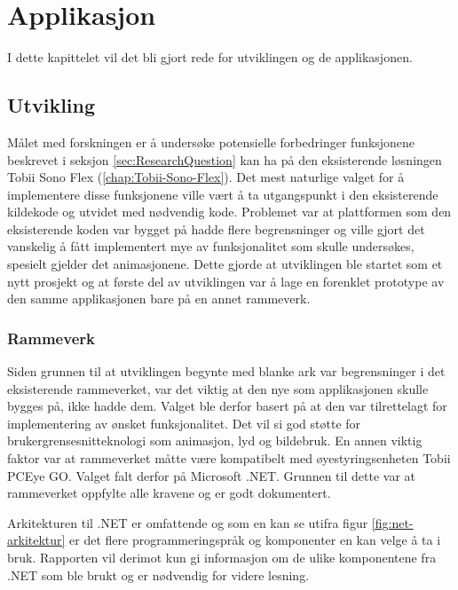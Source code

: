 \documentclass[phd,tocprelim]{cornell}
\begin{document}
\chapter{Applikasjon}

I dette kapittelet vil det bli gjort rede for utviklingen og de applikasjonen.


\section{Utvikling}


Målet med forskningen er å undersøke potensielle forbedringer funksjonene beskrevet i seksjon \ref{sec:ResearchQuestion} kan ha på den eksisterende løsningen Tobii Sono Flex (\ref{chap:Tobii-Sono-Flex}). Det mest naturlige valget for å implementere disse funksjonene ville vært å ta utgangspunkt i den eksisterende kildekode og utvidet med nødvendig kode. Problemet var at plattformen som den eksisterende koden var bygget på hadde flere begrensninger og ville gjort det vanskelig å fått implementert mye av funksjonalitet som skulle undersøkes, spesielt gjelder det animasjonene. Dette gjorde at utviklingen ble startet som et nytt prosjekt og at første del av utviklingen var å lage en forenklet prototype av den samme applikasjonen bare på en annet rammeverk.

\subsection{Rammeverk}

Siden grunnen til at utviklingen begynte med blanke ark var begrensninger i det eksisterende rammeverket, var det viktig at den nye som applikasjonen skulle bygges på, ikke hadde dem. Valget ble derfor basert på at den var tilrettelagt for implementering av ønsket funksjonalitet. Det vil si god støtte for brukergrensesnitteknologi som animasjon, lyd og bildebruk. En annen viktig faktor var at rammeverket måtte være kompatibelt med øyestyringsenheten Tobii PCEye GO.
Valget falt derfor på Microsoft .NET. Grunnen til dette var at rammeverket oppfylte alle kravene og er godt dokumentert.


Arkitekturen til .NET er omfattende og som en kan se utifra figur \ref{fig:net-arkitektur} er det flere programmeringspråk og komponenter en kan velge å ta i bruk. Rapporten vil derimot kun gi informasjon om de ulike komponentene fra .NET som ble brukt og er nødvendig for videre lesning.
\end{document}
